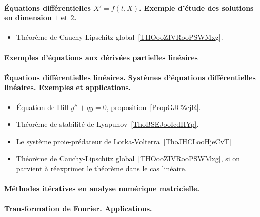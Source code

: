 \paragraph{Équations différentielles \( X'=f(t,X)\). Exemple d'étude des solutions en dimension \( 1\) et \( 2\).}
\begin{itemize}
    \item Théorème de Cauchy-Lipschitz global~\ref{THOooZIVRooPSWMxg}.
\end{itemize}
\paragraph{Exemples d'équations aux dérivées partielles linéaires}
\paragraph{Équations différentielles linéaires. Systèmes d’équations différentielles linéaires. Exemples et applications.}
\begin{itemize}
    \item Équation de Hill \( y''+qy=0\), proposition~\ref{PropGJCZcjR}.
    \item Théorème de stabilité de Lyapunov~\ref{ThoBSEJooIcdHYp}.
    \item Le système proie-prédateur de Lotka-Volterra~\ref{ThoJHCLooHjeCvT}
    \item Théorème de Cauchy-Lipschitz global~\ref{THOooZIVRooPSWMxg}, si on parvient à réexprimer le théorème dans le cas linéaire.
\end{itemize}
\paragraph{Méthodes itératives en analyse numérique matricielle.}
\paragraph{Transformation de Fourier. Applications.}
